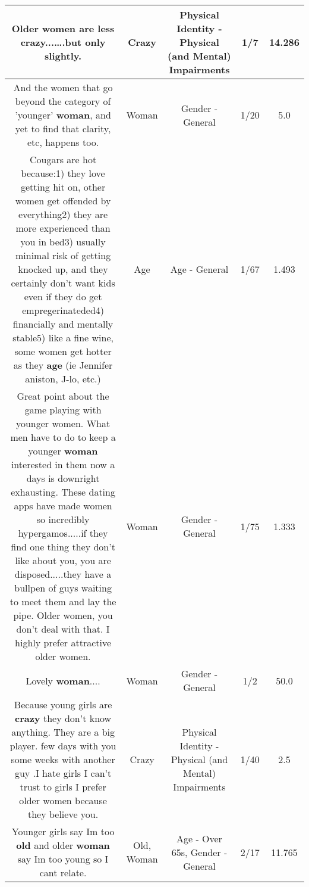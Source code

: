\documentclass[11pt]{article}
\newlength\mylength
\begin{document}
\begin{center}
\begin{longtable}{|C{.65\mylength}|C{.30\mylength}|C{.12\mylength}|C{.12\mylength}|C{.12\mylength}|}
  \small Older women are less \textbf{crazy}...….but only slightly.\normalsize   & Crazy & Physical Identity - Physical (and Mental) Impairments & 1/7 & 14.286 \\  \hline
  \small And the women that go beyond the category of 'younger' \textbf{woman}, and yet to find that clarity, etc, happens too.\normalsize   & Woman & Gender - General & 1/20 & 5.0 \\  \hline
  \small Cougars are hot because:1) they love getting hit on, other women get offended by everything2) they are more experienced than you in bed3) usually minimal risk of getting knocked up, and they certainly don't want kids even if they do get empregerinateded4) financially and mentally stable5) like a fine wine, some women get hotter as they \textbf{age} (ie Jennifer aniston, J-lo, etc.)\normalsize   & Age & Age - General & 1/67 & 1.493 \\  \hline
  \small Great point about the game playing with younger women. What men have to do to keep a younger \textbf{woman} interested in them now a days is downright exhausting. These dating apps have made women so incredibly hypergamos.....if they find one thing they don't like about you, you are disposed.....they have a bullpen of guys waiting to meet them and lay the pipe. Older women, you don't deal with that. I highly prefer attractive older women.\normalsize   & Woman & Gender - General & 1/75 & 1.333 \\  \hline
  \small Lovely \textbf{woman}....\normalsize   & Woman & Gender - General & 1/2 & 50.0 \\  \hline
  \small Because young girls are \textbf{crazy} they don't know anything. They are a big player. few days with you some weeks with another guy .I hate girls I can't trust to girls I prefer older women because they believe you.\normalsize   & Crazy & Physical Identity - Physical (and Mental) Impairments & 1/40 & 2.5 \\  \hline
  \small Younger girls say Im too \textbf{old} and older \textbf{woman} say Im too young so I cant relate.\normalsize   & Old, Woman & Age - Over 65s, Gender - General & 2/17 & 11.765 \\  \hline

\end{longtable}
\end{center}
\end{document}
